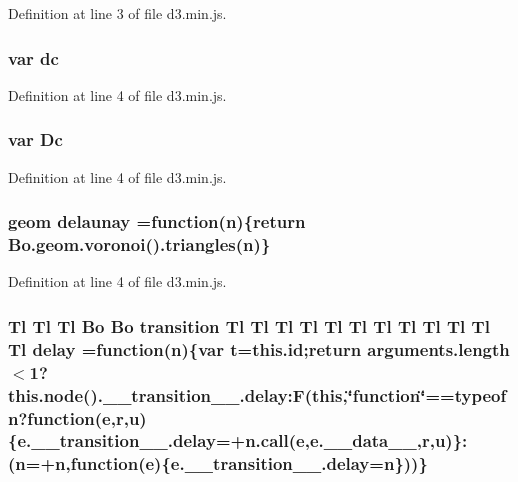 Definition at line 3 of file d3.\+min.\+js.

\subsubsection[{dc}]{\setlength{\rightskip}{0pt plus 5cm}var dc}\label{d3_8min_8js_a17474703a238950a8843f3ba041d695a}


Definition at line 4 of file d3.\+min.\+js.

\subsubsection[{Dc}]{\setlength{\rightskip}{0pt plus 5cm}var Dc}\label{d3_8min_8js_a48095a9db1cd3d6126a0ef38c2e32d2b}


Definition at line 4 of file d3.\+min.\+js.

\subsubsection[{delaunay}]{ geom delaunay =function({\bf n})\{{\bf return} {\bf Bo.\+geom.\+voronoi}().triangles({\bf n})\}}\label{d3_8min_8js_a31c9b0b24c76501e1a1f7fcb4a778520}


Definition at line 4 of file d3.\+min.\+js.

\subsubsection[{delay}]{ {\bf Tl} {\bf Tl} {\bf Tl} {\bf Bo} {\bf Bo} {\bf transition} {\bf Tl} {\bf Tl} {\bf Tl} {\bf Tl} {\bf Tl} {\bf Tl} {\bf Tl} {\bf Tl} {\bf Tl} {\bf Tl} {\bf Tl} {\bf Tl} delay =function({\bf n})\{var t=this.\+id;{\bf return} arguments.\+length$<$1?{\bf this.\+node}().\+\_\+\+\_\+transition\+\_\+\+\_\+[t].delay\+:\+F({\bf this},\char`\"{}function\char`\"{}==typeof {\bf n}?function({\bf e},{\bf r},u)\{e.\+\_\+\+\_\+transition\+\_\+\+\_\+[t].delay=+{\bf n.\+call}({\bf e},e.\+\_\+\+\_\+data\+\_\+\+\_\+,{\bf r},u)\}\+:({\bf n}=+{\bf n},function({\bf e})\{e.\+\_\+\+\_\+transition\+\_\+\+\_\+[t].delay={\bf n}\}))\}}\label{d3_8min_8js_afa0fb8527e155203622cca414ccc317b}



